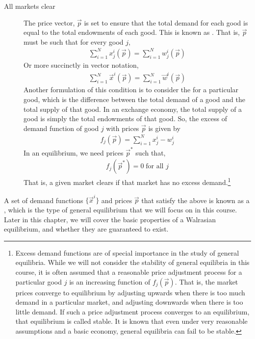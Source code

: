 \begin{description}
    \item[All markets clear] The price vector, $\vec{p}$ is set to ensure that the total demand for each good is equal to the total endowments of each good. This is known as . That is, $\vec{p}$ must be such that for every good $j$, 
    \begin{align*}
        \sum_{i = 1}^N x^i_j(\vec{p}) = \sum_{i = 1}^N w^i_j(\vec{p})
    \end{align*}  
    Or more succinctly in vector notation,
    \begin{align*}
        \sum_{i = 1}^N \vec{x}^i(\vec{p}) = \sum_{i = 1}^N \vec{w}^i(\vec{p})
    \end{align*}
    Another formulation of this condition is to consider the  for a particular good, which is the difference between the total demand of a good and the total supply of that good. In an exchange economy, the total supply of a good is simply the total endowments of that good. So, the excess of demand function of good $j$ with prices $\vec{p}$ is given by
    \begin{align*}
        f_j(\vec{p}) = \sum_{i = 1}^N x^i_j - w^i_j
    \end{align*}
    In an equilibrium, we need prices $\vec{p}^*$ such that,
    \begin{align*}
        f_j(\vec{p}^*) = 0 \; \text{for all $j$}
    \end{align*}
    That is, a given market clears if that market has no excess demand.\footnote{
        Excess demand functions are of special importance in the study of general equilibria. While we will not consider the stability of general equilibria in this course, it is often assumed that a reasonable price adjustment process for a particular good $j$ is an increasing function of $f_j(\vec{p})$. That is, the market prices converge to equilibrium by adjusting upwards when there is too much demand in a particular market, and adjusting downwards when there is too little demand. If such a price adjustment process converges to an equilibrium, that equilibrium is called stable. It is known that even under very reasonable assumptions and a basic economy, general equilibria can fail to be stable. 
    }
\end{description}
A set of demand functions $\{\vec{x}^i\}$ and prices $\vec{p}$ that satisfy the above is known as a , which is the type of general equilibrium that we will focus on in this course. Later in this chapter, we will cover the basic properties of a Walrasian equilibrium, and whether they are guaranteed to exist. 

